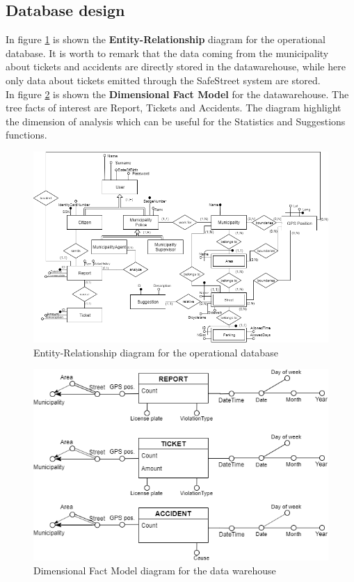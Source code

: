 \documentclass[a4paper]{report}
\begin{document}
\subsection{Database design}
\label{sec:db-design}
In figure \ref{fig:er} is shown the \textbf{Entity-Relationship} diagram for the operational database. It is worth to remark that the data coming from the municipality about tickets and accidents are directly stored in the datawarehouse, while here only data about tickets emitted through the SafeStreet system are stored.\\
In figure \ref{fig:dfm} is shown the \textbf{Dimensional Fact Model} for the datawarehouse. The tree facts of interest are Report, Tickets and Accidents. The diagram highlight the dimension of analysis which can be useful for the Statistics and Suggestions functions.
\begin{figure}[htp]
\includegraphics[width=\textwidth]{ER}
\caption{Entity-Relationship diagram for the operational database}
\label{fig:er}
\end{figure}
\begin{figure}[htp]
\includegraphics[width=\textwidth]{DFM}
\caption{Dimensional Fact Model diagram for the data warehouse}
\label{fig:dfm}
\end{figure}
\end{document}
